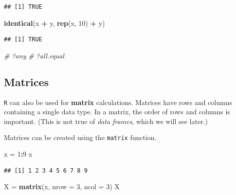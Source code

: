 \documentclass[]{book}
\newenvironment{Shaded}{\begin{snugshade}}{\end{snugshade}}
\newcommand{\KeywordTok}[1]{\textcolor[rgb]{0.13,0.29,0.53}{\textbf{#1}}}
\newcommand{\DataTypeTok}[1]{\textcolor[rgb]{0.13,0.29,0.53}{#1}}
\newcommand{\DecValTok}[1]{\textcolor[rgb]{0.00,0.00,0.81}{#1}}
\newcommand{\StringTok}[1]{\textcolor[rgb]{0.31,0.60,0.02}{#1}}
\newcommand{\CommentTok}[1]{\textcolor[rgb]{0.56,0.35,0.01}{\textit{#1}}}
\newcommand{\OperatorTok}[1]{\textcolor[rgb]{0.81,0.36,0.00}{\textbf{#1}}}
\newcommand{\NormalTok}[1]{#1}
\theoremstyle{definition}
\theoremstyle{definition}
\theoremstyle{definition}
\theoremstyle{remark}
\begin{document}
\begin{verbatim}
## [1] TRUE
\end{verbatim}

\begin{Shaded}
\begin{Highlighting}[]
\KeywordTok{identical}\NormalTok{(x }\OperatorTok{+}\StringTok{ }\NormalTok{y, }\KeywordTok{rep}\NormalTok{(x, }\DecValTok{10}\NormalTok{) }\OperatorTok{+}\StringTok{ }\NormalTok{y)}
\end{Highlighting}
\end{Shaded}

\begin{verbatim}
## [1] TRUE
\end{verbatim}

\begin{Shaded}
\begin{Highlighting}[]
\CommentTok{# ?any}
\CommentTok{# ?all.equal}
\end{Highlighting}
\end{Shaded}

\subsection{Matrices}\label{matrices}

\texttt{R} can also be used for \textbf{matrix} calculations. Matrices
have rows and columns containing a single data type. In a matrix, the
order of rows and columns is important. (This is not true of \emph{data
frames}, which we will see later.)

Matrices can be created using the \texttt{matrix} function.

\begin{Shaded}
\begin{Highlighting}[]
\NormalTok{x =}\StringTok{ }\DecValTok{1}\OperatorTok{:}\DecValTok{9}
\NormalTok{x}
\end{Highlighting}
\end{Shaded}

\begin{verbatim}
## [1] 1 2 3 4 5 6 7 8 9
\end{verbatim}

\begin{Shaded}
\begin{Highlighting}[]
\NormalTok{X =}\StringTok{ }\KeywordTok{matrix}\NormalTok{(x, }\DataTypeTok{nrow =} \DecValTok{3}\NormalTok{, }\DataTypeTok{ncol =} \DecValTok{3}\NormalTok{)}
\NormalTok{X}
\end{Highlighting}
\end{Shaded}
\end{document}
